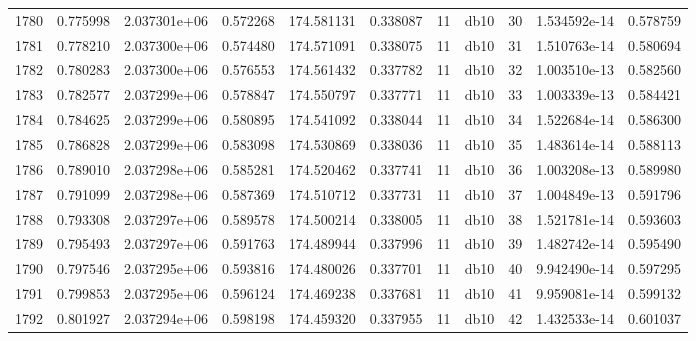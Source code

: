 \begin{tabular}{lrrrrrrlrrr}
1780 &    0.775998 &        2.037301e+06 &  0.572268 &              174.581131 &    0.338087 &      11 &         db10 &     30 &   1.534592e-14 &      0.578759 \\
1781 &    0.778210 &        2.037300e+06 &  0.574480 &              174.571091 &    0.338075 &      11 &         db10 &     31 &   1.510763e-14 &      0.580694 \\
1782 &    0.780283 &        2.037300e+06 &  0.576553 &              174.561432 &    0.337782 &      11 &         db10 &     32 &   1.003510e-13 &      0.582560 \\
1783 &    0.782577 &        2.037299e+06 &  0.578847 &              174.550797 &    0.337771 &      11 &         db10 &     33 &   1.003339e-13 &      0.584421 \\
1784 &    0.784625 &        2.037299e+06 &  0.580895 &              174.541092 &    0.338044 &      11 &         db10 &     34 &   1.522684e-14 &      0.586300 \\
1785 &    0.786828 &        2.037299e+06 &  0.583098 &              174.530869 &    0.338036 &      11 &         db10 &     35 &   1.483614e-14 &      0.588113 \\
1786 &    0.789010 &        2.037298e+06 &  0.585281 &              174.520462 &    0.337741 &      11 &         db10 &     36 &   1.003208e-13 &      0.589980 \\
1787 &    0.791099 &        2.037298e+06 &  0.587369 &              174.510712 &    0.337731 &      11 &         db10 &     37 &   1.004849e-13 &      0.591796 \\
1788 &    0.793308 &        2.037297e+06 &  0.589578 &              174.500214 &    0.338005 &      11 &         db10 &     38 &   1.521781e-14 &      0.593603 \\
1789 &    0.795493 &        2.037297e+06 &  0.591763 &              174.489944 &    0.337996 &      11 &         db10 &     39 &   1.482742e-14 &      0.595490 \\
1790 &    0.797546 &        2.037295e+06 &  0.593816 &              174.480026 &    0.337701 &      11 &         db10 &     40 &   9.942490e-14 &      0.597295 \\
1791 &    0.799853 &        2.037295e+06 &  0.596124 &              174.469238 &    0.337681 &      11 &         db10 &     41 &   9.959081e-14 &      0.599132 \\
1792 &    0.801927 &        2.037294e+06 &  0.598198 &              174.459320 &    0.337955 &      11 &         db10 &     42 &   1.432533e-14 &      0.601037 \\

\end{tabular}
